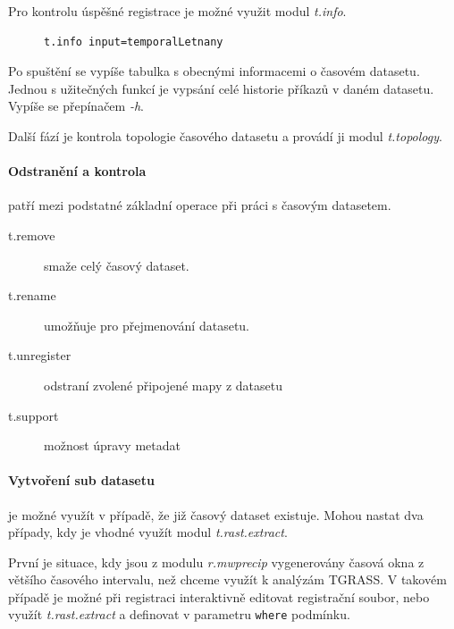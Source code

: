 \documentclass[a4paper,12pt,oneside]{report}
\begin{document}
Pro kontrolu úspěšné registrace je možné využit modul \textit{t.info}.
\begin{figure}[h!]
\begin{footnotesize}
\lstset{extendedchars=false,
escapeinside=''}
\begin{lstlisting}[style=mybash]
t.info input=temporalLetnany      
\end{lstlisting}
\end{footnotesize} 
\end{figure}
Po spuštění se vypíše tabulka s obecnými informacemi o časovém datasetu. Jednou s užitečných funkcí je vypsání celé historie příkazů v daném datasetu. Vypíše se přepínačem \emph{-h}.

Další fází je kontrola topologie časového datasetu a provádí ji  modul \textit{t.topology}.

\paragraph*{Odstranění a kontrola} patří mezi podstatné základní operace při práci s časovým datasetem.
\begin{description}
\item[t.remove] smaže celý časový dataset.  
\item[t.rename] umožňuje pro přejmenování datasetu.
\item[t.unregister] odstraní zvolené připojené mapy z datasetu
\item[t.support] možnost úpravy metadat
\end{description}


\paragraph*{Vytvoření sub datasetu} je možné využít v případě, že již časový dataset existuje. Mohou nastat dva případy, kdy je vhodné využít modul \textit{t.rast.extract}. 

První je situace, kdy jsou z modulu \textit{r.mwprecip} vygenerovány časová okna z většího časového intervalu, než chceme využít k analýzám TGRASS. V takovém případě je možné při registraci interaktivně editovat registrační soubor, nebo využít \textit{t.rast.extract} a definovat v parametru \texttt{where} podmínku.
\end{document}
